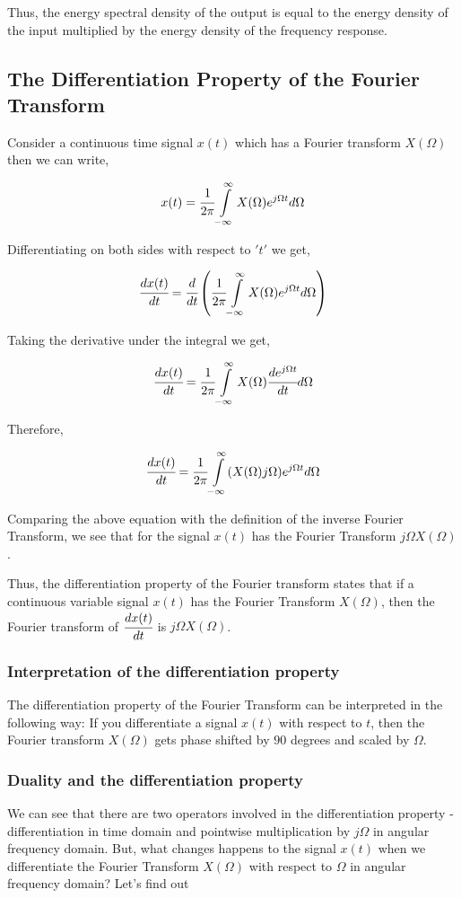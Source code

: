 \noindent
Thus, the energy spectral density of the output is equal to the energy density of the input multiplied by the energy density of the frequency response.

\subsection{The Differentiation Property of the Fourier Transform}


\noindent
Consider a continuous time signal $x(t)$ which has a Fourier transform $X(\Omega)$ then we can write,

$$x(t) = \cfrac{1}{2\pi}\int\limits_{-\infty}^{\infty}X(\Omega)e^{j\Omega t}d\Omega$$

\noindent
Differentiating on both sides with respect to $'t'$ we get,

$$\cfrac{dx(t)}{dt} = \cfrac{d}{dt}\left(\cfrac{1}{2\pi}\int\limits_{-\infty}^{\infty}X(\Omega)e^{j\Omega t}d\Omega\right)$$

\noindent
Taking the derivative under the integral we get,

$$\cfrac{dx(t)}{dt} = \cfrac{1}{2\pi}\int\limits_{-\infty}^{\infty}X(\Omega)\cfrac{de^{j\Omega t}}{dt}d\Omega$$

\noindent
Therefore,

$$\cfrac{dx(t)}{dt} = \cfrac{1}{2\pi}\int\limits_{-\infty}^{\infty}(X(\Omega)j\Omega)e^{j\Omega t}d\Omega$$

\noindent
Comparing the above equation with the definition of the inverse Fourier Transform, we see that for the signal $x(t)$ has the Fourier Transform $j\Omega X(\Omega)$.

\noindent
Thus, the differentiation property of the Fourier transform states that if a continuous variable signal $x(t)$ has the Fourier Transform $X(\Omega)$, then the Fourier transform of $\cfrac{dx(t)}{dt}$ is $j\Omega X(\Omega)$.

\subsubsection{Interpretation of the differentiation property}
\noindent
The differentiation property of the Fourier Transform can be interpreted in the following way: If you differentiate a signal $x(t)$ with respect to $t$, then the Fourier transform $X(\Omega)$ gets phase shifted by $90$ degrees and scaled by $\Omega$.

\subsubsection{Duality and the differentiation property}
\noindent
We can see that there are two operators involved in the differentiation property - differentiation in time domain and pointwise multiplication by $j\Omega$ in angular frequency domain.
But, what changes happens to the signal $x(t)$ when we differentiate the Fourier Transform $X(\Omega)$ with respect to $\Omega$ in angular frequency domain? Let's find out


